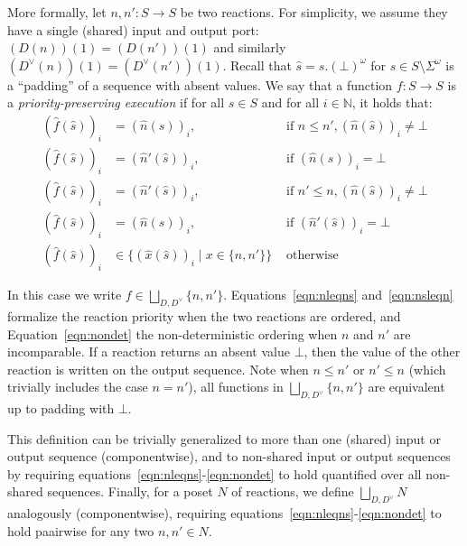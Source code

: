 More formally, let $n, n' : S \rightarrow S$ be two reactions.
For simplicity, we assume they have a single (shared) input and output port: $(D(n))(1) = (D(n'))(1)$ and similarly $(D^\vee(n))(1) = (D^\vee(n'))(1)$.
Recall that $\hat s = s.(\bot)^\omega$ for $s \in S \setminus \Sigma^\omega$ is a ``padding'' of a sequence with absent values.
We say that a function $f : S \rightarrow S$ is a \emph{priority-preserving execution} if for all $s \in S$ and for all $i \in \mathbb{N}$, it holds that:
\begin{align}
\label{eqn:nleqns} (\hat f(\hat s))_i &  =  (\hat n(\hat s))_i, & \text{ if } n \leq n', (\hat n(\hat s))_i \neq \bot \\
\label{eqn:nleqnsbot} (\hat f(\hat s))_i &  =  (\hat n'(\hat s))_i, & \text{ if } (\hat n(\hat s))_i = \bot \\
\label{eqn:nsleqn} (\hat f(\hat s))_i &  =  (\hat n'(\hat s))_i, & \text{ if } n' \leq n, (\hat n(\hat s))_i \neq \bot \\
\label{eqn:nsleqnbot} (\hat f(\hat s))_i &  =  (\hat n(\hat s))_i, & \text{ if } (\hat n'(\hat s))_i = \bot \\
\label{eqn:nondet} (\hat f(\hat s))_i &  \in \{ (\hat x(\hat s))_i \mid x \in \{n,n'\} \} & \text{ otherwise }
\end{align}

In this case we write $f \in \bigsqcup_{D,D^\vee} \{n, n'\}$.
Equations~\ref{eqn:nleqns} and~\ref{eqn:nsleqn} formalize the reaction priority when the two reactions are ordered, and Equation~\ref{eqn:nondet} the non-deterministic ordering when $n$ and $n'$ are incomparable.
If a reaction returns an absent value $\bot$, then the value of the other reaction is written on the output sequence.
Note when $n \leq n'$ or $n' \leq n$ (which trivially includes the case $n = n'$), all functions in $\bigsqcup_{D,D^\vee} \{n,n'\}$ are equivalent up to padding with $\bot$. 

This definition can be trivially generalized to more than one (shared) input or output sequence (componentwise), and to non-shared input or output sequences by requiring equations~\ref{eqn:nleqns}-\ref{eqn:nondet} to hold quantified over all non-shared sequences.
Finally, for a \ac{poset} $N$ of reactions, we define $\bigsqcup_{D,D^\vee} N$ analogously (componentwise), requiring equations~\ref{eqn:nleqns}-\ref{eqn:nondet} to hold paairwise for any two $n, n' \in N$.

